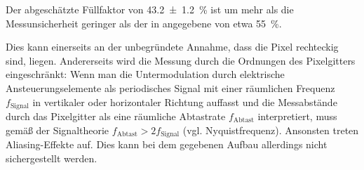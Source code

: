 \documentclass[
	a4paper,
	12pt,
	pagesize,
	ngerman
]{scrartcl}
\begin{document}
			Der abgeschätzte Füllfaktor von \SI{43,2\pm 1,2}{\percent} ist um mehr als die Messunsicherheit geringer als der in \cite{Handbuch} angegebene von etwa \SI{55}{\percent}.

			Dies kann einerseits an der unbegründete Annahme, dass die Pixel rechteckig sind, liegen.
			Andererseits wird die Messung durch die Ordnungen des Pixelgitters eingeschränkt:
			Wenn man die Untermodulation durch elektrische Ansteuerungselemente als periodisches Signal mit einer räumlichen Frequenz $ f_\text{Signal} $ in vertikaler oder horizontaler Richtung auffasst und die Messabstände durch das Pixelgitter als eine räumliche Abtastrate $f_\text{Abtast}$ interpretiert, muss gemäß der Signaltheorie $f_\text{Abtast} > 2 f_\text{Signal}$ (vgl. Nyquistfrequenz).
			Ansonsten treten Aliasing-Effekte auf.
			Dies kann bei dem gegebenen Aufbau allerdings nicht sichergestellt werden.
\end{document}
